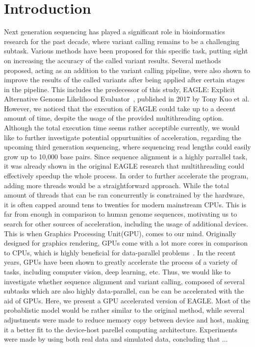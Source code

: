 \documentclass{PHlab-thesis}
\begin{document}
\chapter{Introduction}
Next generation sequencing has played a significant role in bioinformatics research for the past decade, where variant calling remains to be a challenging subtask. Various methods have been proposed for this specific task, putting sight on increasing the accuracy of the called variant results. 
Several methods proposed, acting as an addition to the variant calling pipeline, were also shown to improve the results of the called variants after being applied after certain stages in the pipeline. This includes the predecessor of this study, EAGLE: Explicit Alternative Genome Likelihood Evaluator~\cite{kuo2018eagle}, published in 2017 by Tony Kuo et al. 
However, we noticed that the execution of EAGLE could take up to a decent amount of time, despite the usage of the provided multithreading option. Although the total execution time seems rather acceptible currently, we would like to further investigate potential oppurtunities of acceleration, regarding the upcoming third generation sequencing, where sequencing read lengths could easily grow up to 10,000 base pairs.
Since sequence alignment is a highly parrallel task, it was already shown in the original EAGLE research that multithreading could effectively speedup the whole process. In order to further accelerate the program, adding more threads would be a straightforward approach. While the total amount of threads that can be ran concurrently is constrained by the hardware, it is often capped around tens to twenties for modern mainstream CPUs. This is far from enough in comparison to human genome sequences, motivating us to search for other sources of acceleration, including the usage of additional devices. 
This is when Graphics Processing Unit(GPU), comes to our mind. Originally designed for graphics rendering, GPUs come with a lot more cores in comparison to CPUs, which is highly beneficial for data-parallel problems~\cite{navarro2014survey}. In the recent years, GPUs have been shown to greatly accelerate the process of a variety of tasks, including computer vision, deep learning, etc. Thus, we would like to investigate whether sequence alignment and variant calling, composed of several subtasks which are also highly data-parallel, can be can be accelerated with the aid of GPUs.
Here, we present a GPU accelerated version of EAGLE. Most of the probablistic model would be rather similar to the original method, while several adjustments were made to reduce memory copy between device and host, making it a better fit to the device-host parellel computing architecture. Experiments were made by using both real data and simulated data, concluding that ...
\end{document}
